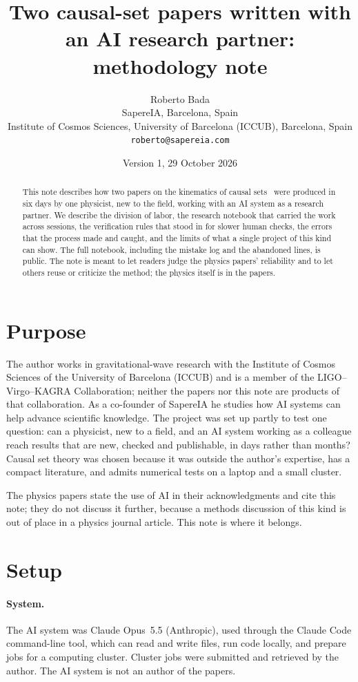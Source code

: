 \documentclass[11pt,a4paper]{article}
\title{Two causal-set papers written with an AI research partner:\\ methodology note}
\author{Roberto Bada\\ \small SapereIA, Barcelona, Spain\\ \small Institute of Cosmos Sciences, University of Barcelona (ICCUB), Barcelona, Spain\\ \small \texttt{roberto@sapereia.com}}
\date{Version 1, 29 October 2026}
\begin{document}
\maketitle

\begin{abstract}
This note describes how two papers on the kinematics of causal sets~\cite{Toolkit,Embedding} were produced in six days by one physicist, new to the field, working with an AI system as a research partner. We describe the division of labor, the research notebook that carried the work across sessions, the verification rules that stood in for slower human checks, the errors that the process made and caught, and the limits of what a single project of this kind can show. The full notebook, including the mistake log and the abandoned lines, is public. The note is meant to let readers judge the physics papers' reliability and to let others reuse or criticize the method; the physics itself is in the papers.
\end{abstract}

\section{Purpose}
The author works in gravitational-wave research with the Institute of Cosmos Sciences of the University of Barcelona (ICCUB) and is a member of the LIGO--Virgo--KAGRA Collaboration; neither the papers nor this note are products of that collaboration. As a co-founder of SapereIA he studies how AI systems can help advance scientific knowledge. The project was set up partly to test one question: can a physicist, new to a field, and an AI system working as a colleague reach results that are new, checked and publishable, in days rather than months? Causal set theory was chosen because it was outside the author's expertise, has a compact literature, and admits numerical tests on a laptop and a small cluster.

The physics papers state the use of AI in their acknowledgments and cite this note; they do not discuss it further, because a methods discussion of this kind is out of place in a physics journal article. This note is where it belongs.

\section{Setup}
\paragraph{System.} The AI system was Claude Opus~5.5 (Anthropic), used through the Claude Code command-line tool, which can read and write files, run code locally, and prepare jobs for a computing cluster. Cluster jobs were submitted and retrieved by the author. The AI system is not an author of the papers.
\end{document}
